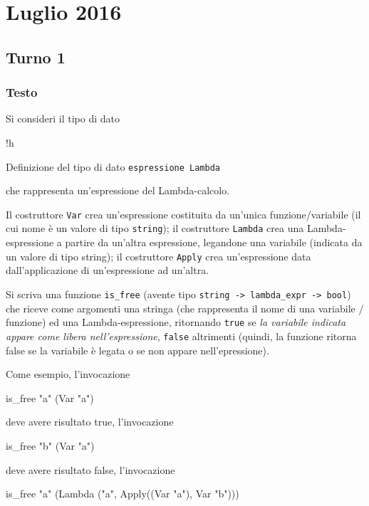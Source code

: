 \section{Luglio 2016}

\subsection{Turno 1}

\subsubsection{Testo}

Si consideri il tipo di dato
\begin{listing}{!h}
\caption[]{Definizione del tipo di dato \texttt{espressione Lambda}}
\end{listing}
che rappresenta un'espressione del Lambda-calcolo.

\medskip
Il costruttore \texttt{Var} crea un'espressione costituita da un'unica funzione/variabile (il cui nome è un valore di tipo \texttt{string});
il costruttore \texttt{Lambda} crea una Lambda-espressione a partire da un'altra espressione, legandone una variabile (indicata da un valore di tipo string);
il costruttore \texttt{Apply} crea un'espressione data dall'applicazione di un'espressione ad un'altra.

\medskip
Si scriva una funzione \texttt{is_free} (avente tipo \texttt{string -> lambda_expr -> bool}) che riceve come argomenti una stringa (che rappresenta il nome di una variabile / funzione) ed una Lambda-espressione, %
ritornando \texttt{true} se \emph{la variabile indicata appare come libera nell'espressione}, %
\texttt{false} altrimenti (quindi, la funzione ritorna false se la variabile è legata o se non appare nell'epressione).

\medskip
Come esempio, l'invocazione

\begin{smlcode}
is_free "a" (Var "a")
\end{smlcode}

deve avere risultato true, l'invocazione

\begin{smlcode}
is_free "b" (Var "a")
\end{smlcode}

deve avere risultato false, l'invocazione

\begin{smlcode}
is_free "a" (Lambda ("a", Apply((Var "a"), Var "b")))
\end{smlcode}

